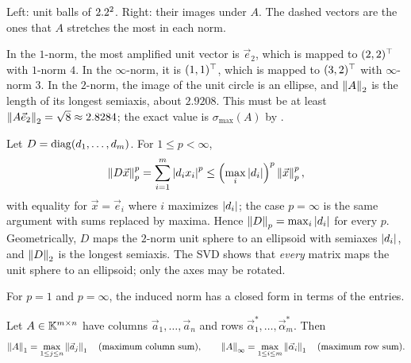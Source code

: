 \begin{example}
\begin{center}
  \small Left: unit balls of $2.2^2$. Right: their images under $A$. The dashed vectors are the ones that $A$ stretches the most in each norm.
  \end{center}

  In the $1$-norm, the most amplified unit vector is $\vec{e}_2$, which is mapped to $(2, 2)^\top$ with $1$-norm $4$. In the $\infty$-norm, it is $(1, 1)^\top$, which is mapped to $(3, 2)^\top$ with $\infty$-norm $3$. In the $2$-norm, the image of the unit circle is an ellipse, and $\left\lVert A \right\rVert_2$ is the length of its longest semiaxis, about $2.9208$. This must be at least $\left\lVert A\vec{e}_2 \right\rVert_2 = \sqrt{8} \approx 2.8284$; the exact value is $\sigma_{\max}(A)$ by .
\end{example}

\begin{example}
  Let $D = \operatorname{diag}(d_1, \dots, d_m)$. For $1 \le p < \infty$,
  \begin{equation}
    \left\lVert D\vec{x} \right\rVert_p^p = \sum_{i=1}^{m}\left\lvert d_ix_i \right\rvert^p \le \left(\max_i\left\lvert d_i \right\rvert\right)^p\left\lVert \vec{x} \right\rVert_p^p,
  \end{equation}
  with equality for $\vec{x} = \vec{e}_i$ where $i$ maximizes $\left\lvert d_i \right\rvert$; the case $p = \infty$ is the same argument with sums replaced by maxima. Hence $\left\lVert D \right\rVert_p = \max_i\left\lvert d_i \right\rvert$ for every $p$. Geometrically, $D$ maps the $2$-norm unit sphere to an ellipsoid with semiaxes $\left\lvert d_i \right\rvert$, and $\left\lVert D \right\rVert_2$ is the longest semiaxis. The SVD shows that \emph{every} matrix maps the unit sphere to an ellipsoid; only the axes may be rotated.
\end{example}

For $p = 1$ and $p = \infty$, the induced norm has a closed form in terms of the entries.

\begin{proposition}
  \label{prop:one-inf-norm}
  Let $A \in \mathbb{K}^{m \times n}$ have columns $\vec{a}_1, \dots, \vec{a}_n$ and rows $\vec{\alpha}_1^\ast, \dots, \vec{\alpha}_m^\ast$. Then
  \begin{equation}
    \left\lVert A \right\rVert_1 = \max_{1 \le j \le n}\left\lVert \vec{a}_j \right\rVert_1 \quad\text{(maximum column sum)}, \qquad \left\lVert A \right\rVert_\infty = \max_{1 \le i \le m}\left\lVert \vec{\alpha}_i \right\rVert_1 \quad\text{(maximum row sum)}.
  \end{equation}
\end{proposition}

